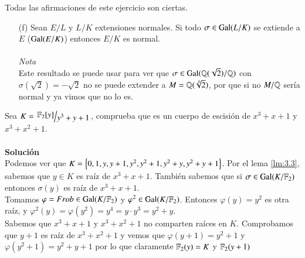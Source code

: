 \begin{ex}[H3.10]
    Todas las afirmaciones de este ejercicio son ciertas.
    \begin{itemize}
        \item[(f)] Sean $E/L$ y $L/K$ extensiones normales. Si todo $\sigma \in \mathrm{Gal}(L/K)$ se extiende a $E$ ($\mathrm{Gal}(E/K)$) entonces $E/K$ es normal.\\\\
        \textit{Nota}\\
        Este resultado se puede usar para ver que $\sigma \in \mathrm{Gal}(\mathbb{Q}(\sqrt 2)/\mathbb{Q})$ con $\sigma(\sqrt 2) = -\sqrt 2$ no se puede extender a $M = \mathbb{Q}(\sqrt[4]{2})$, por que si no $M/\mathbb{Q}$ sería normal y ya vimos que no lo es.
    \end{itemize}
\end{ex}

\begin{ex}[H3.4]
    Sea $K = \quo{\F_2[y]}{y^3 + y + 1}$, comprueba que es un cuerpo de escisión de $x^3 + x + 1$ y $x^3 + x^2 + 1$.\\\\
    \textbf{Solución}\\
    Podemos ver que $K = \left\{0, 1, y, y+1, y^2, y^2+1, y^2+y, y^2+y+1\right\}$. Por el lema \ref{lm:3.3}, sabemos que $y \in K$ es raíz de $x^3+x+1$. También sabemos que si $\sigma \in \mathrm{Gal}(K/\mathbb{F}_2)$ entonces $\sigma(y)$ es raíz de $x^3+x+1$.\\
    Tomamos $\varphi = Frob \in \mathrm{Gal}(K/\mathbb{F}_2)$ y $\varphi^2 \in \mathrm{Gal}(K/\mathbb{F}_2)$. Entonces $\varphi(y) = y^2$ es otra raíz, y $\varphi^2(y) = \varphi(y^2) = y^4 = y \cdot y^3 = y^2+y$.\\
    Sabemos que $x^3+x+1$ y $x^3+x^2+1$ no comparten raíces en $K$. Comprobamos que $y+1$ es raíz de $x^3+x^2+1$ y vemos que $\varphi(y+1)=y^2+1$ y $\varphi(y^2+1) = y^2+y+1$ por lo que claramente $\mathbb{F}_2(y) = K$ y $\mathbb{F}_2(y+1)$
\end{ex}
